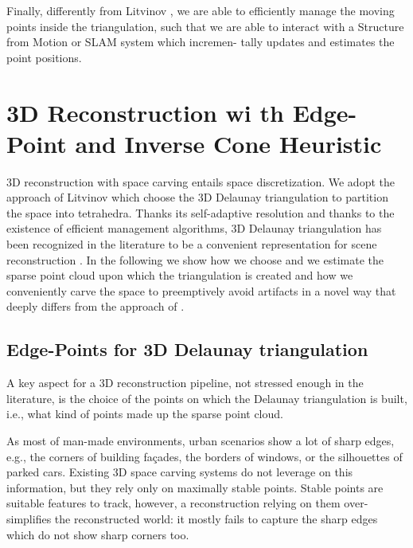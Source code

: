 Finally, differently from Litvinov \etal \cite{litvinov_lhuillier_13}, we are able to efficiently
manage the moving points inside the triangulation, such that we are able to
interact with a Structure from Motion or SLAM system which incremen-
tally updates and estimates the point positions.



\section{3D Reconstruction wi th Edge-Point and Inverse Cone Heuristic}
\label{sec:3D-Reconstruction}
3D reconstruction with space carving entails space discretization.
We adopt the approach of Litvinov \etal \cite{litvinov_lhuillier_13}  which choose the 3D Delaunay triangulation to partition the space into tetrahedra. 
Thanks its self-adaptive resolution and thanks to the existence of efficient management algorithms, 3D Delaunay triangulation has been recognized in the literature to be a
convenient representation for scene reconstruction  \cite{litvinov_lhuillier_13, Pan_et_al09, labatut2007efficient, lovi_et_al_11}. In the following we show how we choose and we estimate the sparse point cloud
upon which the triangulation is created and how we conveniently carve the
space to preemptively avoid artifacts in a novel way that deeply differs from
the approach of \cite{litvinov_Lhiuller14}.


\subsection{Edge-Points for 3D Delaunay triangulation}
\label{subsec:pcl_estimation}
A key aspect for a 3D reconstruction pipeline, not stressed enough in the literature, is the choice of the points on which the Delaunay triangulation is built, i.e., what kind of points made up the sparse point cloud.

As most of man-made environments, urban scenarios show a lot of sharp edges, e.g., the corners of building fa\c{c}ades, the borders of windows, or the silhouettes of parked cars. Existing 3D space carving systems do not leverage on this information, but they rely only on maximally stable points.
Stable points are suitable features to track, however, a reconstruction relying on them over-simplifies the reconstructed world: it mostly fails to capture the sharp edges which do not show sharp corners too.

